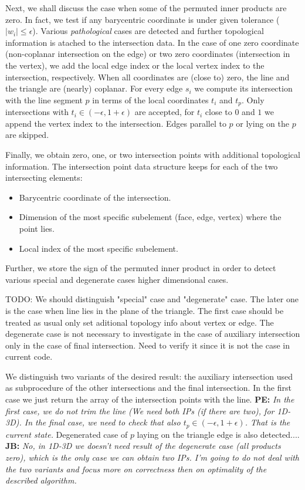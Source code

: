 \documentclass{elsarticle}
\def\abs#1{\left|#1\right|}
\def\abs#1{| #1 |}
\newcommand{\noteJB}[1]{{\color{Blue} \textbf{JB: } \textit{#1}}}
\newcommand{\notePE}[1]{{\color{Orange} \textbf{PE: } \textit{#1}}}
\begin{document}
Next, we shall discuss the case when some of the permuted inner products are zero. In fact, we test if any barycentric coordinate is under given tolerance 
($\abs{w_i} \le \epsilon$). Various \emph{pathological} cases are detected and further topological 
information is atached to the intersection data.  In the case of one zero coordinate (non-coplanar intersection on the edge)
or two zero coordinates (intersection in the vertex), we add the local edge index or the local vertex index to the intersection, respectively.
When all coordinates are (close to) zero, the line and the triangle are (nearly) coplanar. For every edge $s_i$ we compute
its intersection with the line segment $p$ in terms of the local coordinates $t_i$ and $t_p$. Only intersections with $t_i \in (-\epsilon, 1+\epsilon)$
are accepted, for $t_i$ close to $0$ and $1$ we append the vertex index to the intersection. Edges parallel to $p$ or lying on the $p$ are skipped.

Finally, we obtain zero, one, or two intersection points with additional topological information.
The intersection point data structure keeps for each of the two intersecting elements:
\begin{itemize}
 \item Barycentric coordinate of the intersection.
 \item Dimension of the most specific subelement (face, edge, vertex) where the point lies.
 \item Local index of the most specific subelement.
\end{itemize}
Further, we store the sign of the permuted inner product in order to detect various special and degenerate cases higher dimensional cases.


TODO:
We should distinguish "special" case and "degenerate" case. The later one is the case when line lies in the plane of the triangle. The first case should be
treated as usual only set aditional topology info about vertex or edge. The degenerate case is not necessary to investigate in the case of auxiliary
intersection only in the case of final intersection. Need to verify it since it is not the case in current code.


We distinguish two variants of the desired result: the auxiliary intersection used as subprocedure of the other intersections and the final intersection.
In the first case we just return the array of the intersection points with the line.
\notePE{In the first case, we do not trim the line (We need both IPs (if there are two), for 1D-3D). In the final case, we need to check that also $t_p \in (-\epsilon, 1+\epsilon)$. That is the current state.}
 Degenerated case of $p$ laying on the triangle edge is also detected....
\noteJB{No, in 1D-3D we doesn't need result of the degenerate case (all products zero), which is the only case we can obtain two IPs. 
I'm going to do not deal with the two variants and focus more on correctness then on optimality of the described algorithm.}
\end{document}
